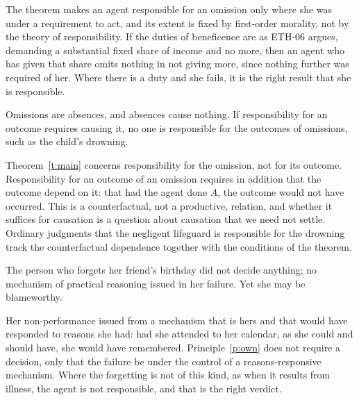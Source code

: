 \documentclass{situationist-preprint}
\begin{document}
\begin{reply}
The theorem makes an agent responsible for an omission only where she was under a requirement to act, and its extent is fixed by first-order morality, not by the theory of responsibility. If the duties of beneficence are as ETH-06 argues, demanding a substantial fixed share of income and no more, then an agent who has given that share omits nothing in not giving more, since nothing further was required of her. Where there is a duty and she fails, it is the right result that she is responsible.
\end{reply}

\begin{objection}
Omissions are absences, and absences cause nothing. If responsibility for an outcome requires causing it, no one is responsible for the outcomes of omissions, such as the child's drowning.
\end{objection}

\begin{reply}
Theorem~\ref{t:main} concerns responsibility for the omission, not for its outcome. Responsibility for an outcome of an omission requires in addition that the outcome depend on it: that had the agent done $A$, the outcome would not have occurred. This is a counterfactual, not a productive, relation, and whether it suffices for causation is a question about causation that we need not settle. Ordinary judgments that the negligent lifeguard is responsible for the drowning track the counterfactual dependence together with the conditions of the theorem.
\end{reply}

\begin{objection}
The person who forgets her friend's birthday did not decide anything; no mechanism of practical reasoning issued in her failure. Yet she may be blameworthy.
\end{objection}

\begin{reply}
Her non-performance issued from a mechanism that is hers and that would have responded to reasons she had: had she attended to her calendar, as she could and should have, she would have remembered. Principle~\ref{p:own} does not require a decision, only that the failure be under the control of a reasons-responsive mechanism. Where the forgetting is not of this kind, as when it results from illness, the agent is not responsible, and that is the right verdict.
\end{reply}
\end{document}
